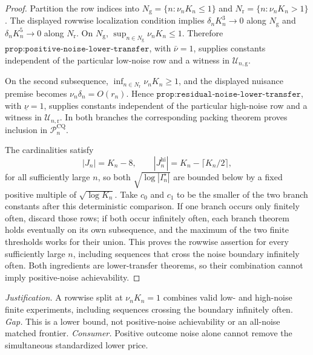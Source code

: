 \documentclass{article}
\begin{document}
\begin{proof}
Partition the row indices into \(N_{\mathrm g}=\{n:\nu_nK_n\leq1\}\) and \(N_{\mathrm r}=\{n:\nu_nK_n>1\}\).  The displayed rowwise localization condition implies \(\delta_nK_n^3\to0\) along \(N_{\mathrm g}\) and \(\delta_nK_n^5\to0\) along \(N_{\mathrm r}\).  On \(N_{\mathrm g}\), \(\sup_{n\in N_{\mathrm g}}\nu_nK_n\leq1\).  Therefore \(\texttt{prop:positive-noise-lower-transfer}\), with \(\bar\nu=1\), supplies constants independent of the particular low-noise row and a witness in \(\mathcal U_{n,\mathrm g}\).

On the second subsequence, \(\inf_{n\in N_{\mathrm r}}\nu_nK_n\geq1\), and the displayed nuisance premise becomes \(\nu_n\delta_n=O(r_n)\).  Hence \(\texttt{prop:residual-noise-lower-transfer}\), with \(\underline\nu=1\), supplies constants independent of the particular high-noise row and a witness in \(\mathcal U_{n,\mathrm r}\).  In both branches the corresponding packing theorem proves inclusion in \(\mathcal P_n^{\mathrm{CQ}}\).

The cardinalities satisfy
\[
 |J_n|=K_n-8,\qquad |J_n^{\mathrm{hi}}|=K_n-\lceil K_n/2\rceil,
\]
for all sufficiently large \(n\), so both \(\sqrt{\log|I_n^\star|}\) are bounded below by a fixed positive multiple of \(\sqrt{\log K_n}\).  Take \(c_0\) and \(c_1\) to be the smaller of the two branch constants after this deterministic comparison.  If one branch occurs only finitely often, discard those rows; if both occur infinitely often, each branch theorem holds eventually on its own subsequence, and the maximum of the two finite thresholds works for their union.  This proves the rowwise assertion for every sufficiently large \(n\), including sequences that cross the noise boundary infinitely often.  Both ingredients are lower-transfer theorems, so their combination cannot imply positive-noise achievability.
\end{proof}
\par\smallskip\noindent \textit{Justification.} A rowwise split at \(\nu_nK_n=1\) combines valid low- and high-noise finite experiments, including sequences crossing the boundary infinitely often. \textit{Gap.} This is a lower bound, not positive-noise achievability or an all-noise matched frontier. \textit{Consumer.} Positive outcome noise alone cannot remove the simultaneous standardized lower price.
\end{document}
